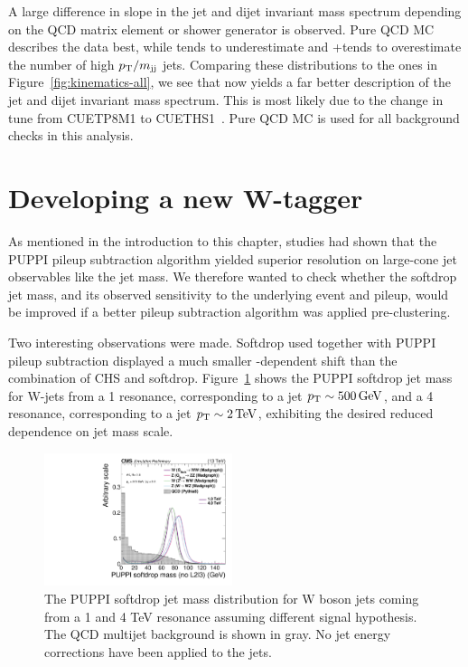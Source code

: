 A large difference in slope in the jet \PT and dijet invariant mass spectrum depending on the QCD matrix element or shower generator is observed. Pure \PYTHIA QCD MC describes the data best, while \HERWIG{++} tends to underestimate and \amcatnlo{}+\PYTHIA tends to overestimate the number of high $p_{\mathrm{T}}/m_\mathrm{jj}$ jets. Comparing these distributions to the ones in Figure~\ref{fig:kinematics-all}, we see that  now yields a far better description of the jet \PT and dijet invariant mass spectrum. This is most likely due to the change in tune from CUETP8M1 to CUETHS1~\cite{Khachatryan:2015pea}. Pure  QCD MC is used for all background checks in this analysis. 

\section{Developing a new W-tagger}
\label{sec:searchII:puppisoftdrop}
As mentioned in the introduction to this chapter, studies had shown that the PUPPI pileup subtraction algorithm yielded superior resolution on large-cone jet observables like the jet mass. We therefore wanted to check whether the softdrop jet mass, and its observed sensitivity to the underlying event and pileup, would be improved if a better pileup subtraction algorithm was applied pre-clustering.\par
Two interesting observations were made. Softdrop used together with PUPPI pileup subtraction displayed a much smaller \PT-dependent shift than the combination of CHS and softdrop. Figure~\ref{fig:searchII:sdmass} shows the PUPPI softdrop jet mass for W-jets from a 1 \TeV resonance, corresponding to a jet $p_{\mathrm{T}}\sim 500 \,\text{Ge\hspace{-.08em}V}$, and a 4 \TeV resonance, corresponding to a jet $p_{\mathrm{T}}\sim 2 \,\text{Te\hspace{-.08em}V}$, exhibiting the desired reduced \PT dependence on jet mass scale. 
\begin{figure}[h!]
\centering
\includegraphics[width=0.49\textwidth]{figures/analysis/search2/AN-16-235/plots/gen_SoftdropMassUnCorr.pdf}
\caption{The PUPPI softdrop jet mass distribution for W boson jets coming from a 1 and 4 TeV resonance assuming different signal hypothesis. The QCD multijet background is shown in gray. No jet energy corrections have been applied to the jets.}
\label{fig:searchII:sdmass}
\end{figure}
